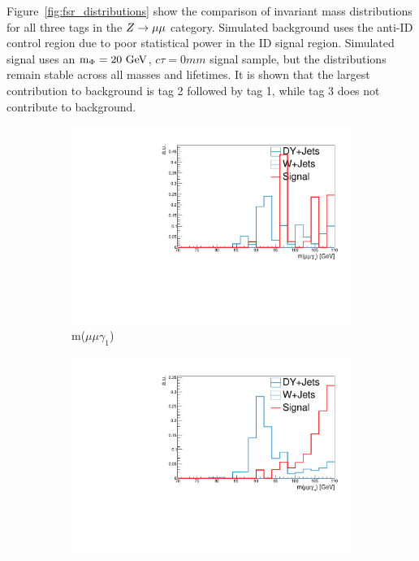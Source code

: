Figure~\ref{fig:fsr_distributions} show the comparison of invariant mass distributions for all three tags in the $\VZ\to\mu\mu$ category. Simulated background uses the anti-ID control region due to poor statistical power in the ID signal region. Simulated signal uses an $\mphi=20\unit{GeV}$, $c\tau=0\unit{mm}$ signal sample, but the distributions remain stable across all masses and lifetimes. It is shown that the largest contribution to background is tag 2 followed by tag 1, while tag 3 does not contribute to background. 

\begin{figure}[htb!]
	\centering
	\captionsetup[subfigure]{justification=centering}
	\begin{subfigure}[h]{.32\linewidth}
		\centering
		\includegraphics[width=\linewidth]{figs/05_analysis/2018_ZX_Zg1_mass_MU_preFSR_mx20_comp.pdf}
		\caption{m($\mu\mu\gamma_1$)}
	\end{subfigure}
	\begin{subfigure}[h]{.32\linewidth}
		\centering
		\includegraphics[width=\linewidth]{figs/05_analysis/2018_ZX_Zg2_mass_MU_preFSR_mx20_comp.pdf}

\end{subfigure}
\end{figure}
